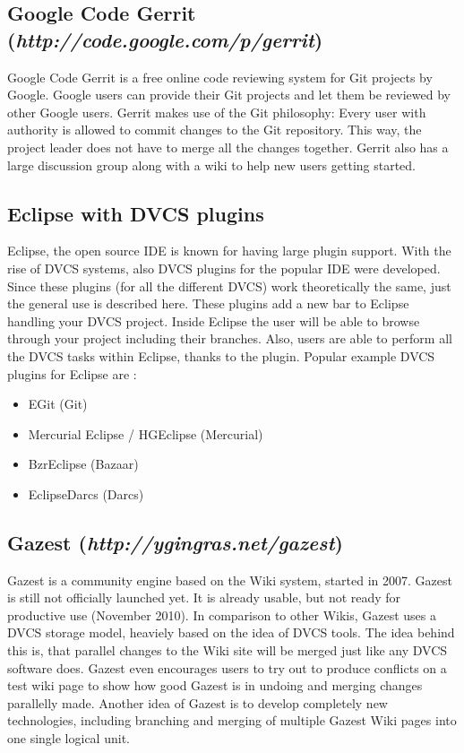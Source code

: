 \subsection{Google Code Gerrit \\(\textit{http://code.google.com/p/gerrit})}

Google Code Gerrit is a free online code reviewing system for Git projects by Google. Google users can provide their Git projects and let them be reviewed by other Google users. Gerrit makes use of the Git philosophy: Every user with authority is allowed to commit changes to the Git repository. This way, the project leader does not have to merge all the changes together. Gerrit also has a large discussion group along with a wiki to help new users getting started. 

\subsection{Eclipse with DVCS plugins}

Eclipse, the open source IDE is known for having large plugin support. With the rise of DVCS systems, also DVCS plugins for the popular IDE were developed. Since these plugins (for all the different DVCS) work theoretically the same, just the general use is described here. These plugins add a new bar to Eclipse handling your DVCS project. Inside Eclipse the user will be able to browse through your project including their branches. Also, users are able to perform all the DVCS tasks within Eclipse, thanks to the plugin.
\newline
Popular example DVCS plugins for Eclipse are \cite{eclipseplugins}:

\begin{itemize}
	\item EGit (Git)
	\item Mercurial Eclipse / HGEclipse (Mercurial)
	\item BzrEclipse (Bazaar)
	\item EclipseDarcs (Darcs)
\end{itemize}

\subsection{Gazest (\textit{http://ygingras.net/gazest})}

Gazest is a community engine based on the Wiki system, started in 2007. Gazest is still not officially launched yet. It is already usable, but not ready for productive use (November 2010). In comparison to other Wikis, Gazest uses a DVCS storage model, heaviely based on the idea of DVCS tools. The idea behind this is, that parallel changes to the Wiki site will be merged just like any DVCS software does. Gazest even encourages users to try out to produce conflicts on a test wiki page to show how good Gazest is in undoing and merging changes parallelly made. Another idea of Gazest is to develop completely new technologies, including branching and merging of multiple Gazest Wiki pages into one single logical unit.
